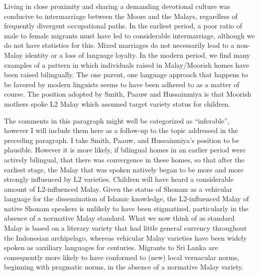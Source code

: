 Living in close proximity and sharing a demanding devotional culture was conducive to intermarriage between the Moors and the Malays, regardless of frequently divergent occupational paths. In the earliest period, a poor ratio of male to female migrants must have led to considerable intermarriage, although we do not have statistics for this. Mixed marriages do not necessarily lead to a non-Malay identity or a loss of language loyalty. In the modern period, we find many examples of a pattern in which individuals raised in Malay/Moorish homes have been raised bilingually. The one parent, one language approach that happens to be favored by modern linguists seems to have been adhered to as a matter of course. The position adopted by Smith, Paauw and Hussainmiya is that Moorish mothers spoke L2 Malay which assumed target variety status for children.

The comments in this paragraph might well be categorized as ``inferable'', however I will include them here as a follow-up to the topic addressed in the preceding paragraph. I take Smith, Paauw, and Hussainmiya's position to be plausible. However it is more likely, if bilingual homes in an earlier period were actively bilingual, that there was convergence in these homes, so that after the earliest stage, the Malay that was spoken natively began to be more and more strongly influenced by L2 varieties. Children will have heard a considerable amount of L2-influenced Malay. Given the status of Shonam as a vehicular language for the dissemination of Islamic knowledge, the L2-influenced Malay of native Shonam speakers is unlikely to have been stigmatized, particularly in the absence of a normative Malay standard. What we now think of as standard Malay is based on a literary variety that had little general currency throughout the Indonesian archipelago, whereas vehicular Malay varieties have been widely spoken as auxiliary languages for centuries. Migrants to Sri Lanka are consequently more likely to have conformed to (new) local vernacular norms, beginning with pragmatic norms, in the absence of a normative Malay variety.

